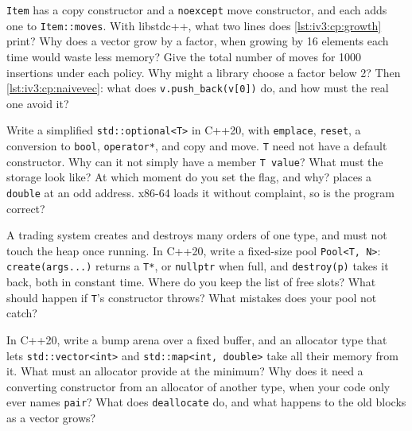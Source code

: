 \begin{question}\label{iq:iv3:cpp:41}
\texttt{Item} has a copy constructor and a \texttt{noexcept} move constructor, and each adds one to \texttt{Item::moves}. With libstdc++, what two lines does \cref{lst:iv3:cp:growth} print? Why does a vector grow by a factor, when growing by 16 elements each time would waste less memory? Give the total number of moves for 1000 insertions under each policy. Why might a library choose a factor below 2? Then \cref{lst:iv3:cp:naivevec}: what does \texttt{v.push\_back(v[0])} do, and how must the real one avoid it?
\label{lst:iv3:cp:growth}
\label{lst:iv3:cp:naivevec}
\end{question}

\begin{question}\label{iq:iv3:cpp:42}
Write a simplified \texttt{std::optional<T>} in C++20, with \texttt{emplace}, \texttt{reset}, a conversion to \texttt{bool}, \texttt{operator*}, and copy and move. \texttt{T} need not have a default constructor. Why can it not simply have a member \texttt{T value}? What must the storage look like? At which moment do you set the flag, and why?  places a \texttt{double} at an odd address. x86-64 loads it without complaint, so is the program correct?
\label{lst:iv3:cp:misaligned}
\end{question}

\begin{question}\label{iq:iv3:cpp:43}
A trading system creates and destroys many orders of one type, and must not touch the heap once running. In C++20, write a fixed-size pool \texttt{Pool<T, N>}: \texttt{create(args.{}.{}.)} returns a \texttt{T*}, or \texttt{nullptr} when full, and \texttt{destroy(p)} takes it back, both in constant time. Where do you keep the list of free slots? What should happen if \texttt{T}'s constructor throws? What mistakes does your pool not catch?
\end{question}

\begin{question}\label{iq:iv3:cpp:44}
In C++20, write a bump arena over a fixed buffer, and an allocator type that lets \texttt{std::vector<int>} and \texttt{std::map<int, double>} take all their memory from it. What must an allocator provide at the minimum? Why does it need a converting constructor from an allocator of another type, when your code only ever names \texttt{pair}? What does \texttt{deallocate} do, and what happens to the old blocks as a vector grows?
\end{question}

